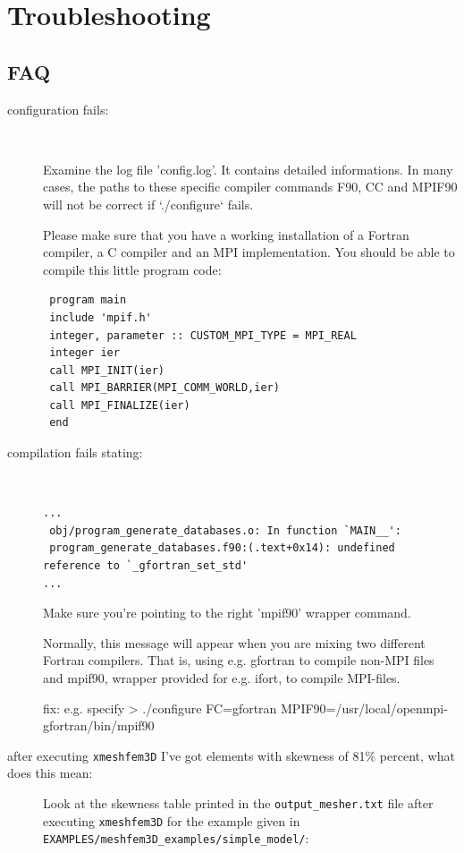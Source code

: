 \chapter{Troubleshooting}\label{cha:Troubleshooting}


\section*{FAQ}
\begin{description}
\item [{configuration fails:}]~


Examine the log file 'config.log'. It contains detailed informations.
In many cases, the paths to these specific compiler commands F90,
CC and MPIF90 will not be correct if `./configure` fails.\newline


Please make sure that you have a working installation of a Fortran
compiler, a C compiler and an MPI implementation. You should be able
to compile this little program code:

{\footnotesize
\begin{verbatim}
 program main
 include 'mpif.h'
 integer, parameter :: CUSTOM_MPI_TYPE = MPI_REAL
 integer ier
 call MPI_INIT(ier)
 call MPI_BARRIER(MPI_COMM_WORLD,ier)
 call MPI_FINALIZE(ier)
 end
\end{verbatim}
}

\item [{compilation fails stating:}] ~
{\footnotesize
\begin{verbatim}
...
 obj/program_generate_databases.o: In function `MAIN__':
 program_generate_databases.f90:(.text+0x14): undefined reference to `_gfortran_set_std'
...
\end{verbatim}
}

Make sure you're pointing to the right 'mpif90' wrapper command.\newline


Normally, this message will appear when you are mixing two different
Fortran compilers. That is, using e.g. gfortran to compile non-MPI
files and mpif90, wrapper provided for e.g. ifort, to compile MPI-files.\newline


fix: e.g. specify > ./configure FC=gfortran MPIF90=/usr/local/openmpi-gfortran/bin/mpif90

\item [{after executing \texttt{xmeshfem3D} I've got elements with skewness of 81\% percent, what does this mean:}] Look
at the skewness table printed in the \texttt{output\_mesher.txt} file
after executing \texttt{xmeshfem3D} for the example given in \texttt{EXAMPLES/meshfem3D\_examples/simple\_model/}:


\end{description}

